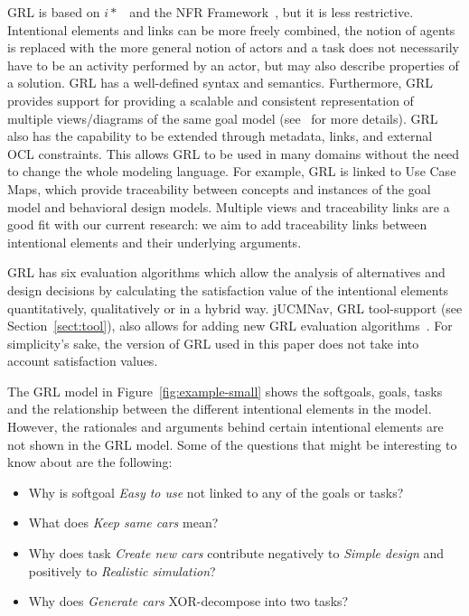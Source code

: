 GRL is based on $i*$~\cite{yu1997towards} and the NFR Framework~\cite{chung2012non}, but it is less restrictive. Intentional elements and links can be more freely combined, the notion of agents is replaced with the more general notion of actors and a task does not necessarily have to be an activity performed by an actor, but may also describe properties of a solution. GRL has a well-defined syntax and semantics. Furthermore, GRL provides support for providing a scalable and consistent representation of multiple views/diagrams of the same goal model (see~\cite[Ch.2]{Ghanavati2013} for more details). GRL also has the capability to be extended through metadata, links, and external OCL constraints. This allows GRL to be used in many domains without the need to change the whole modeling language. For example, GRL is linked to Use Case Maps, which provide traceability between concepts and instances of the goal model and behavioral design models. Multiple views and traceability links are a good fit with our current research: we aim to add traceability links between intentional elements and their underlying arguments. 

GRL has six evaluation algorithms which allow the analysis of alternatives and design decisions by calculating the satisfaction value of the intentional elements quantitatively, qualitatively or in a hybrid way. jUCMNav, GRL tool-support (see Section~\ref{sect:tool}), also allows for adding new GRL evaluation algorithms~\cite{jUCMNav}. For simplicity's sake, the version of GRL used in this paper does not take into account satisfaction values.

The GRL model in Figure~\ref{fig:example-small} shows the softgoals, goals, tasks and the relationship between the different intentional elements in the model. However, the rationales and arguments behind certain intentional elements are not shown in the GRL model. Some of the questions that might be interesting to know about are the following:

\begin{itemize}
	\item Why is softgoal \emph{Easy to use} not linked to any of the goals or tasks? 
	\item What does \emph{Keep same cars} mean?
	\item Why does task \emph{Create new cars} contribute negatively to \emph{Simple design} and positively to \emph{Realistic simulation}?
	\item Why does \emph{Generate cars} XOR-decompose into two tasks?
\end{itemize}

